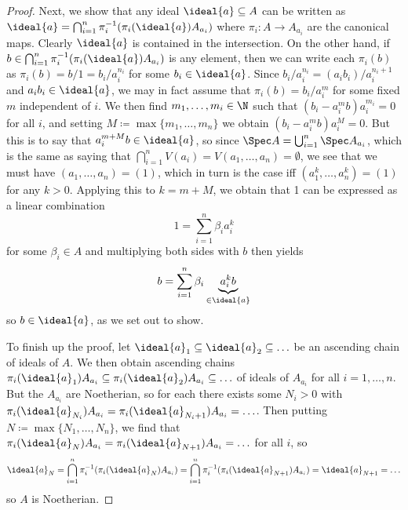 \documentclass[wip, algebra]{bsteffan-lecturenotes}
\begin{document}
\begin{proof}
	Next, we show that any ideal $\ideal{a} \subseteq A$ can be written as $\ideal{a} = \bigcap_{i = 1}^n \pi_i^{-1}(\pi_i(\ideal{a}) A_{a_i})$ where $\pi_i\colon A \to A_{a_i}$ are the canonical maps.
	Clearly $\ideal{a}$ is contained in the intersection.
	On the other hand, if $b \in \bigcap_{i = 1}^n \pi_i^{-1}(\pi_i(\ideal{a}) A_{a_i})$ is any element, then we can write each $\pi_i(b)$ as $\pi_i(b) = b / 1 = b_i / a_i^{n_i}$ for some $b_i \in \ideal{a}$.
	Since $b_i / a_i^{n_i} = (a_i b_i) / a_i^{n_i + 1}$ and $a_i b_i \in \ideal{a}$, we may in fact assume that $\pi_i(b) = b_i / a_i^m$ for some fixed $m$ independent of $i$.
	We then find $m_1, \ldots, m_i \in \N$ such that $(b_i - a_i^m b) a_i^{m_i} = 0$ for all $i$, and setting $M \coloneq \max \{m_1, \ldots, m_n\}$ we obtain $(b_i - a_i^m b) a_i^M = 0$.
	But this is to say that $a_i^{m + M} b \in \ideal{a}$, so since $\Spec A = \bigcup_{i = 1}^n \Spec A_{a_i}$, which is the same as saying that $\bigcap_{i = 1}^n V(a_i) = V(a_1, \ldots, a_n) = \emptyset$, we see that we must have $(a_1, \ldots, a_n) = (1)$, which in turn is the case iff $(a_1^k, \ldots, a_n^k) = (1)$ for any $k > 0$.
	Applying this to $k = m + M$, we obtain that 1 can be expressed as a linear combination
	\begin{equation*}
		1 = \sum_{i = 1}^n \beta_i a_i^k
	\end{equation*}
	for some $\beta_i \in A$ and multiplying both sides with $b$ then yields
	\begin{equation*}
		b = \sum_{i = 1}^n \beta_i \underbrace{a_i^k b}_{\in \ideal{a}}
	\end{equation*}
	so $b \in \ideal{a}$, as we set out to show.

	To finish up the proof, let $\ideal{a}_1 \subseteq \ideal{a}_2 \subseteq \ldots$ be an ascending chain of ideals of $A$.
	We then obtain ascending chains $\pi_i(\ideal{a}_1) A_{a_i} \subseteq \pi_i(\ideal{a}_2) A_{a_i} \subseteq \ldots$ of ideals of $A_{a_i}$ for all $i = 1, \ldots, n$.
	But the $A_{a_i}$ are Noetherian, so for each there exists some $N_i > 0$ with $\pi_i(\ideal{a}_{N_i}) A_{a_i} = \pi_i(\ideal{a}_{N_i + 1}) A_{a_i} = \ldots$.
	Then putting $N \coloneq \max \{N_1, \ldots, N_n\}$, we find that $\pi_i(\ideal{a}_N) A_{a_i} = \pi_i(\ideal{a}_{N + 1}) A_{a_i} = \ldots$ for all $i$, so 
	\begin{equation*}
		\ideal{a}_N = \bigcap_{i = 1}^n \pi_i^{-1}(\pi_i(\ideal{a}_N) A_{a_i}) = \bigcap_{i = 1}^n \pi_i^{-1}(\pi_i(\ideal{a}_{N + 1}) A_{a_i}) = \ideal{a}_{N + 1} = \ldots
	\end{equation*}
	so $A$ is Noetherian.
\end{proof}
\end{document}
